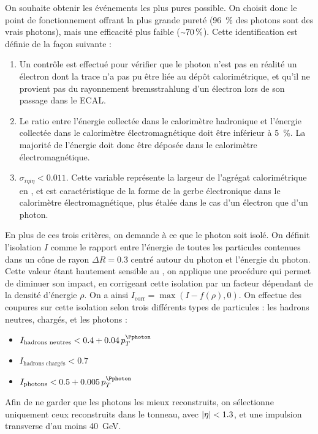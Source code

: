 On souhaite obtenir les événements les plus pures possible. On choisit donc le point de fonctionnement offrant la plus grande pureté (\tilde\SI{96}{\%} des photons sont des vrais photons), mais une efficacité plus faible ($\tilde \SI{70}{\%}$). Cette identification est définie de la façon suivante :

\begin{enumerate}
    \item Un contrôle est effectué pour vérifier que le photon n'est pas en réalité un électron dont la trace n'a pas pu être liée au dépôt calorimétrique, et qu'il ne provient pas du rayonnement bremsstrahlung d'un électron lors de son passage dans le ECAL.
    \item Le ratio entre l'énergie collectée dans le calorimètre hadronique et l'énergie collectée dans le calorimètre électromagnétique doit être inférieur à \SI{5}{\%}. La majorité de l'énergie doit donc être déposée dans le calorimètre électromagnétique.
    \item $\sigma_{i\eta i\eta} < \num{0.011}$. Cette variable représente la largeur de l'agrégat calorimétrique en \aeta, et est caractéristique de la forme de la gerbe électronique dans le calorimètre électromagnétique, plus étalée dans le cas d'un électron que d'un photon.
\end{enumerate}

En plus de ces trois critères, on demande à ce que le photon soit isolé. On définit l'isolation $I$ comme le rapport entre l'énergie de toutes les particules \pf contenues dans un cône de rayon $\Delta R = \num{0.3}$ centré autour du photon et l'énergie du photon. Cette valeur étant hautement sensible au \pu, on applique une procédure qui permet de diminuer son impact, en corrigeant cette isolation par un facteur dépendant de la densité d'énergie $\rho$. On a ainsi $I_\text{corr} = \max{\left(I - f(\rho), 0\right)}$. On effectue des coupures sur cette isolation selon trois différents types de particules : les hadrons neutres, chargés, et les photons :

\begin{itemize}
    \item $I_\text{hadrons neutres} < \num{0.4} + \num{0.04} \, p_T^{\Pphoton}$
    \item $I_\text{hadrons chargés} < \num{0.7}$
    \item $I_\text{photons} < \num{0.5} + \num{0.005} \, p_T^{\Pphoton}$
\end{itemize}

Afin de ne garder que les photons les mieux reconstruits, on sélectionne uniquement ceux reconstruits dans le tonneau, avec $\lvert \eta \rvert < \num{1.3}$, et une impulsion transverse d'au moins \SI{40}{\GeV}.

